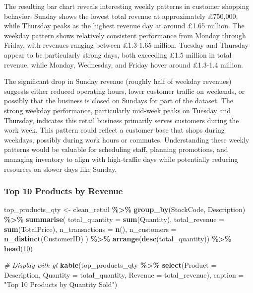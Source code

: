 \documentclass[
]{article}
\newenvironment{Shaded}{\begin{snugshade}}{\end{snugshade}}
\newcommand{\AttributeTok}[1]{\textcolor[rgb]{0.13,0.29,0.53}{#1}}
\newcommand{\CommentTok}[1]{\textcolor[rgb]{0.56,0.35,0.01}{\textit{#1}}}
\newcommand{\DecValTok}[1]{\textcolor[rgb]{0.00,0.00,0.81}{#1}}
\newcommand{\FunctionTok}[1]{\textcolor[rgb]{0.13,0.29,0.53}{\textbf{#1}}}
\newcommand{\NormalTok}[1]{#1}
\newcommand{\OtherTok}[1]{\textcolor[rgb]{0.56,0.35,0.01}{#1}}
\newcommand{\SpecialCharTok}[1]{\textcolor[rgb]{0.81,0.36,0.00}{\textbf{#1}}}
\newcommand{\StringTok}[1]{\textcolor[rgb]{0.31,0.60,0.02}{#1}}
\begin{document}
The resulting bar chart reveals interesting weekly patterns in customer
shopping behavior. Sunday shows the lowest total revenue at
approximately £750,000, while Thursday peaks as the highest revenue day
at around £1.65 million. The weekday pattern shows relatively consistent
performance from Monday through Friday, with revenues ranging between
£1.3-1.65 million. Tuesday and Thursday appear to be particularly strong
days, both exceeding £1.5 million in total revenue, while Monday,
Wednesday, and Friday hover around £1.3-1.4 million.

The significant drop in Sunday revenue (roughly half of weekday
revenues) suggests either reduced operating hours, lower customer
traffic on weekends, or possibly that the business is closed on Sundays
for part of the dataset. The strong weekday performance, particularly
mid-week peaks on Tuesday and Thursday, indicates this retail business
primarily serves customers during the work week. This pattern could
reflect a customer base that shops during weekdays, possibly during work
hours or commutes. Understanding these weekly patterns would be valuable
for scheduling staff, planning promotions, and managing inventory to
align with high-traffic days while potentially reducing resources on
slower days like Sunday.\newpage

\subsubsection{Top 10 Products by
Revenue}\label{top-10-products-by-revenue}

\begin{Shaded}
\begin{Highlighting}[]
\NormalTok{top\_products\_qty }\OtherTok{\textless{}{-}}\NormalTok{ clean\_retail }\SpecialCharTok{\%\textgreater{}\%}
  \FunctionTok{group\_by}\NormalTok{(StockCode, Description) }\SpecialCharTok{\%\textgreater{}\%}
  \FunctionTok{summarise}\NormalTok{(}
    \AttributeTok{total\_quantity =} \FunctionTok{sum}\NormalTok{(Quantity),}
    \AttributeTok{total\_revenue =} \FunctionTok{sum}\NormalTok{(TotalPrice),}
    \AttributeTok{n\_transactions =} \FunctionTok{n}\NormalTok{(),}
    \AttributeTok{n\_customers =} \FunctionTok{n\_distinct}\NormalTok{(CustomerID)}
\NormalTok{  ) }\SpecialCharTok{\%\textgreater{}\%}
  \FunctionTok{arrange}\NormalTok{(}\FunctionTok{desc}\NormalTok{(total\_quantity)) }\SpecialCharTok{\%\textgreater{}\%}
  \FunctionTok{head}\NormalTok{(}\DecValTok{10}\NormalTok{)}

\CommentTok{\# Display with gt}
\FunctionTok{kable}\NormalTok{(top\_products\_qty }\SpecialCharTok{\%\textgreater{}\%}
  \FunctionTok{select}\NormalTok{(}\AttributeTok{Product =}\NormalTok{ Description, }\AttributeTok{Quantity =}\NormalTok{ total\_quantity, }\AttributeTok{Revenue =}\NormalTok{ total\_revenue), }
  \AttributeTok{caption =} \StringTok{"Top 10 Products by Quantity Sold"}\NormalTok{)}
\end{Highlighting}
\end{Shaded}
\end{document}
